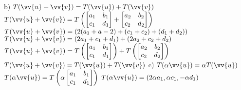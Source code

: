 \documentclass[11pt,a4paper]{article}
\newcommand\taba[1][2.55cm]{\hspace*{#1}}
\begin{document}
\begin{flushleft}
\taba b) $T(\vv{u} + \vv{v}) = T(\vv{u}) + T(\vv{v})$\linebreak
\taba \hspace{0.4cm}  $T(\vv{u} + \vv{v}) = T\begin{pmatrix} {\begin{bmatrix} a_1 & b_1 \\c_1 & d_1 \end{bmatrix}} + {\begin{bmatrix} a_2 & b_2 \\c_2 & d_2\end{bmatrix}}\end{pmatrix}$ \linebreak
\taba \hspace{0.4cm}  $T(\vv{u} + \vv{v}) = (2(a_1+a-2) + (c_1+c_2) + (d_1+d_2))$ \linebreak
\taba \hspace{0.4cm}  $T(\vv{u} + \vv{v}) = (2a_1 + c_1 + d_1) + (2a_2+c_2+d_2)$ \linebreak
\taba \hspace{0.4cm}  $T(\vv{u} + \vv{v}) = T\begin{pmatrix}\begin{bmatrix} a_1 & b_1 \\c_1 & d_1\end{bmatrix}\end{pmatrix} +  T\begin{pmatrix}\begin{bmatrix} a_2 & b_2 \\c_2 & d_2\end{bmatrix}\end{pmatrix}$ 
\linebreak \taba \hspace{0.4cm} $T(\vv{u} + \vv{v}) = T(\vv{u}) + T(\vv{v})$ \linebreak \newline
\taba c) $T(\alpha \vv{u}) = \alpha T(\vv{u})$\linebreak
\taba \hspace{0.4cm} $T(\alpha \vv{u}) = T\begin{pmatrix} {\alpha\begin{bmatrix} a_1 & b_1 \\c_1 & d_1 \end{bmatrix}}\end{pmatrix}$\linebreak
\taba \hspace{0.4cm} $T(\alpha \vv{u}) = (2 \alpha a_1,\alpha c_1,-\alpha d_1)$ \linebreak

\end{flushleft}
\end{document}
